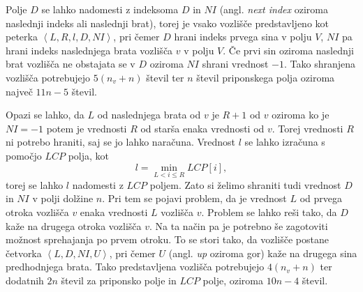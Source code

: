 Polje $D$ se lahko nadomesti z indeksoma $D$ in $NI$ (angl. \textit{next index} oziroma naslednji indeks ali naslednji brat), torej je vsako vozlišče predstavljeno kot peterka $\left< L, R, l, D, NI \right>$, pri čemer $D$ hrani indeks prvega sina v polju $V$, $NI$ pa hrani indeks naslednjega brata vozlišča $v$ v polju $V$. Če prvi sin oziroma naslednji brat vozlišča ne obstajata se v $D$ oziroma $NI$ shrani vrednost $-1$. Tako shranjena vozlišča potrebujejo $5(n_v+n)$ števil ter $n$ števil priponskega polja oziroma največ $11n-5$ števil.

Opazi se lahko, da $L$ od naslednjega brata od $v$ je $R+1$ od $v$ oziroma ko je $NI=-1$ potem je vrednosti $R$ od starša enaka vrednosti od $v$. Torej vrednosti $R$ ni potrebo hraniti, saj se jo lahko naračuna. Vrednost $l$ se lahko izračuna s pomočjo $LCP$ polja, kot
$$l=\min_{L<i\le R}LCP[i],$$
torej se lahko $l$ nadomesti z $LCP$ poljem. Zato si želimo shraniti tudi vrednost $D$ in $NI$ v polji dolžine $n$. Pri tem se pojavi problem, da je vrednost $L$ od prvega otroka vozlišča $v$ enaka vrednosti $L$ vozlišča $v$. Problem se lahko reši tako, da $D$ kaže na drugega otroka vozlišča $v$. Na ta način pa je potrebno še zagotoviti možnost sprehajanja po prvem otroku. To se stori tako, da vozlišče postane četvorka $\left< L, D, NI, U \right>$, pri čemer $U$ (angl. \textit{up} oziroma gor) kaže na drugega sina predhodnjega brata. Tako predstavljena vozlišča potrebujejo $4(n_v+n)$ ter dodatnih $2n$ števil za priponsko polje in $LCP$ polje, oziroma $10n-4$ števil.


